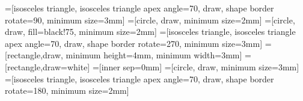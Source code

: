
\usepackage[utf8]{inputenc}
\usepackage[reqno]{amsmath}
\usepackage{amsthm}
\usepackage{amsfonts,amssymb}
\usepackage{mathrsfs}   %
\usepackage[mathscr]{euscript}
\usepackage[all]{xy}
\usepackage{stmaryrd}
\usepackage{graphicx}
\usepackage{array}
\usepackage{fancyvrb}
\usepackage{proof}
\usepackage{delarray}
\usepackage{float}
\usepackage{varioref}

\usepackage{wrapfig}
\usepackage{subfig}
\usepackage{caption}
\usepackage{supertabular}
\usepackage{blkarray}
\usepackage{cite}
\usepackage{xspace}
\usepackage[colorlinks=true,citecolor=magenta]{hyperref}
\usepackage{hyperref}
\usepackage[shortlabels]{enumitem}
\usepackage{multicol}
\usepackage{tikz}
\usetikzlibrary{calc,arrows,positioning,shapes.geometric,fit,decorations.markings}


\tikzset{ node distance=.1mm, inner sep=0.5mm}

=[isosceles triangle, isosceles triangle apex angle=70, draw, shape border rotate=90, minimum size=3mm]
=[circle, draw, minimum size=2mm]
=[circle, draw, fill=black!75, minimum size=2mm]
=[isosceles triangle, isosceles triangle apex angle=70, draw, shape border rotate=270, minimum size=3mm]
=[rectangle,draw, minimum height=4mm, minimum width=3mm]
=[rectangle,draw=white]
=[inner sep=0mm]
=[circle, draw, minimum size=3mm]
=[isosceles triangle, isosceles triangle apex angle=70, draw, shape border rotate=180, minimum size=2mm]

\reversemarginpar

\def\figurename{Figure}
\def\tablename{Table}




